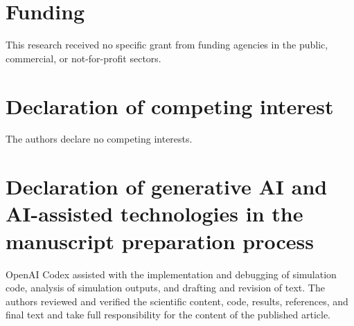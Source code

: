 \documentclass[preprint,11pt]{elsarticle}
\begin{document}
\section*{Funding}
This research received no specific grant from funding agencies in the public,
commercial, or not-for-profit sectors.

\section*{Declaration of competing interest}
The authors declare no competing interests.

\section*{Declaration of generative AI and AI-assisted technologies in the manuscript preparation process}
OpenAI Codex assisted with the implementation and debugging of simulation
code, analysis of simulation outputs, and drafting and revision of text.
The authors reviewed and verified the scientific content, code, results,
references, and final text and take full responsibility for the content of
the published article.


\end{document}

